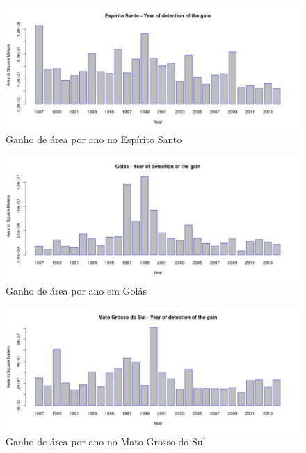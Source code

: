 \begin{figure}[H]
    \centering
    \includegraphics[scale=.5]{images/gain_graphics/Espirito_Santo_gain.pdf}
    \caption{Ganho de área por ano no Espírito Santo}
    \label{fig:gain_espirito_santo}
\end{figure}

\begin{figure}[H]
    \centering
    \includegraphics[scale=.5]{images/gain_graphics/Goias_gain.pdf}
    \caption{Ganho de área por ano em Goiás}
    \label{fig:gain_goias}
\end{figure}

\begin{figure}[H]
    \centering
    \includegraphics[scale=.5]{images/gain_graphics/Mato Grosso do Sul_gain.pdf}
    \caption{Ganho de área por ano no Mato Grosso do Sul}
    \label{fig:gain_mato_grosso_sul}
\end{figure}

